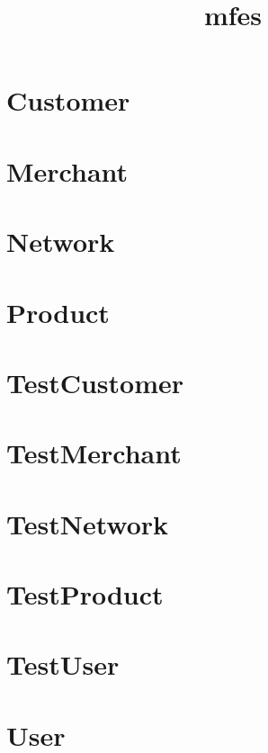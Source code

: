 \documentclass{article}
\begin{document}
\title{mfes}
\author{}
\maketitle
\tableofcontents

\section{Customer}

\section{Merchant}

\section{Network}

\section{Product}

\section{TestCustomer}

\section{TestMerchant}

\section{TestNetwork}

\section{TestProduct}

\section{TestUser}

\section{User}

\end{document}
